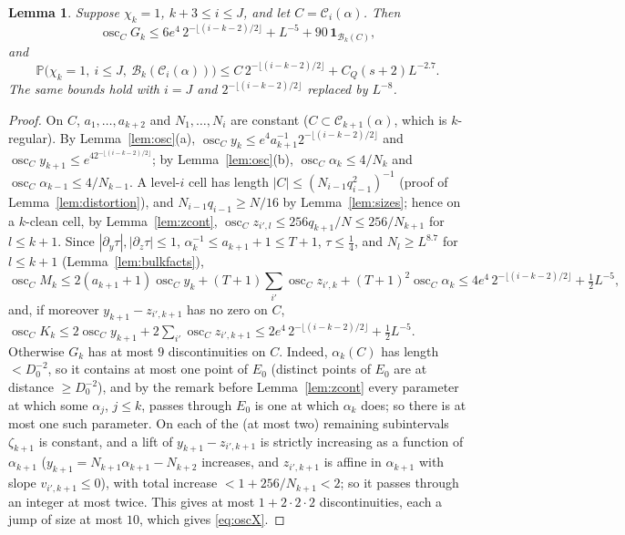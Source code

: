 \documentclass[11pt]{amsart}
\newtheorem{lemma}[theorem]{Lemma}
\theoremstyle{definition}
\numberwithin{equation}{section}
\newcommand{\Prob}{\mathbb{P}}
\newcommand{\cC}{\mathcal{C}}
\newcommand{\cB}{\mathcal{B}}
\newcommand{\ind}{\mathbf{1}}
\DeclareMathOperator{\osc}{osc}
\begin{document}
\begin{lemma}\label{lem:oscG}
Suppose $\chi_k=1$, $k+3\le i\le J$, and let $C=\cC_i(\alpha)$. Then
\begin{equation}\label{eq:oscX}
\osc_CG_k\le 6e^4\,2^{-\lfloor(i-k-2)/2\rfloor}+L^{-5}+90\,\ind_{\cB_k(C)} ,
\end{equation}
and
\begin{equation}\label{eq:PB}
\Prob\big(\chi_k=1,\ i\le J,\ \cB_k(\cC_i(\alpha))\big)\le C\,2^{-\lfloor(i-k-2)/2\rfloor}+C_Q(s+2)L^{-2.7}.
\end{equation}
The same bounds hold with $i=J$ and $2^{-\lfloor(i-k-2)/2\rfloor}$ replaced by $L^{-8}$.
\end{lemma}

\begin{proof}
On $C$, $a_1,\dots,a_{k+2}$ and $N_1,\dots,N_i$ are constant ($C\subset\cC_{k+1}(\alpha)$, which is $k$-regular). By Lemma~\ref{lem:osc}(a),
$\osc_Cy_k\le e^4a_{k+1}^{-1}2^{-\lfloor(i-k-2)/2\rfloor}$ and $\osc_Cy_{k+1}\le e^42^{-\lfloor(i-k-2)/2\rfloor}$; by Lemma~\ref{lem:osc}(b), $\osc_C\alpha_k\le4/N_k$ and
$\osc_C\alpha_{k-1}\le4/N_{k-1}$. A level-$i$ cell has length $|C|\le(N_{i-1}q_{i-1}^2)^{-1}$ (proof of Lemma~\ref{lem:distortion}), and
$N_{i-1}q_{i-1}\ge N/16$ by Lemma~\ref{lem:sizes}; hence on a $k$-clean cell, by Lemma~\ref{lem:zcont}, $\osc_Cz_{i',l}\le256q_{k+1}/N\le256/N_{k+1}$ for
$l\le k+1$. Since $|\partial_y\tau|,|\partial_z\tau|\le1$, $\alpha_k^{-1}\le a_{k+1}+1\le T+1$, $\tau\le\frac14$, and $N_l\ge L^{8.7}$ for $l\le k+1$ (Lemma~\ref{lem:bulkfacts}),
\[
\osc_CM_k\le2(a_{k+1}+1)\osc_Cy_k+(T+1)\sum_{i'}\osc_Cz_{i',k}+(T+1)^2\osc_C\alpha_k\le4e^4\,2^{-\lfloor(i-k-2)/2\rfloor}+\tfrac12L^{-5},
\]
and, if moreover $y_{k+1}-z_{i',k+1}$ has no zero on $C$, $\osc_CK_k\le2\osc_Cy_{k+1}+2\sum_{i'}\osc_Cz_{i',k+1}\le2e^4\,2^{-\lfloor(i-k-2)/2\rfloor}+\tfrac12L^{-5}$.
Otherwise $G_k$ has at most $9$ discontinuities on $C$. Indeed, $\alpha_k(C)$ has length $<D_0^{-2}$, so it contains at most one point of $E_0$ (distinct
points of $E_0$ are at distance $\ge D_0^{-2}$), and by the remark before Lemma~\ref{lem:zcont} every parameter at which some $\alpha_j$, $j\le k$, passes
through $E_0$ is one at which $\alpha_k$ does; so there is at most one such parameter. On each of the (at most two) remaining subintervals $\zeta_{k+1}$ is
constant, and a lift of $y_{k+1}-z_{i',k+1}$ is strictly increasing as a function of $\alpha_{k+1}$ ($y_{k+1}=N_{k+1}\alpha_{k+1}-N_{k+2}$ increases, and
$z_{i',k+1}$ is affine in $\alpha_{k+1}$ with slope $v_{i',k+1}\le0$), with total increase $<1+256/N_{k+1}<2$; so it passes through an integer at most twice.
This gives at most $1+2\cdot2\cdot2$ discontinuities, each a jump of size at most $10$, which gives \eqref{eq:oscX}.


\end{proof}
\end{document}
